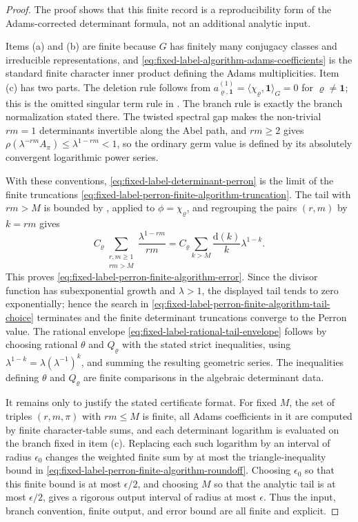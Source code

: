 \documentclass[11pt,a4paper]{amsart}
\theoremstyle{plain}
\theoremstyle{definition}
\theoremstyle{remark}
\begin{document}
\begin{proof}
  The proof shows that this finite record is a reproducibility form of the
  Adams-corrected determinant formula, not an additional analytic input.

  Items (a) and (b) are finite because \(G\) has finitely many conjugacy
  classes and irreducible representations, and
  \eqref{eq:fixed-label-algorithm-adams-coefficients} is the standard
  finite character inner product defining the Adams multiplicities.  Item
  (c) has two parts.  The deletion rule follows from
  \(a_{\varrho,\mathbf1}^{(1)}=\langle\chi_\varrho,\mathbf1\rangle_G=0\)
  for \(\varrho\neq\mathbf1\); this is the omitted singular term rule in
  .  The branch rule is exactly the
  branch normalization stated there.  The twisted spectral gap makes the
  non-trivial \(rm=1\) determinants invertible along the Abel path, and
  \(rm\ge2\) gives \(\rho(\lambda^{-rm}A_\pi)\le\lambda^{1-rm}<1\), so the
  ordinary germ value is defined by its absolutely convergent logarithmic
  power series.

  With these conventions, \eqref{eq:fixed-label-determinant-perron} is the
  limit of the finite truncations
  \eqref{eq:fixed-label-perron-finite-algorithm-truncation}.  The tail with
  \(rm>M\) is bounded by
  , applied to
  \(\phi=\chi_\varrho\), and regrouping the pairs \((r,m)\) by
  \(k=rm\) gives
  \[
    C_\varrho
    \sum_{\substack{r,m\ge1\\rm>M}}\frac{\lambda^{1-rm}}{rm}
    =
    C_\varrho\sum_{k>M}\frac{\mathrm d(k)}{k}\lambda^{1-k}.
  \]
  This proves \eqref{eq:fixed-label-perron-finite-algorithm-error}.  Since
  the divisor function has subexponential growth and \(\lambda>1\), the
  displayed tail tends to zero exponentially; hence the search in
  \eqref{eq:fixed-label-perron-finite-algorithm-tail-choice} terminates and
  the finite determinant truncations converge to the Perron value.  The
  rational envelope \eqref{eq:fixed-label-rational-tail-envelope} follows by
  choosing rational \(\theta\) and \(Q_\varrho\) with the stated strict
  inequalities, using \(\lambda^{1-k}=\lambda(\lambda^{-1})^k\), and summing
  the resulting geometric series.  The inequalities defining \(\theta\) and
  \(Q_\varrho\) are finite comparisons in the algebraic determinant data.

  It remains only to justify the stated certificate format.  For fixed
  \(M\), the set of triples \((r,m,\pi)\) with \(rm\le M\) is finite, all
  Adams coefficients in it are computed by finite character-table sums, and
  each determinant logarithm is evaluated on the branch fixed in item (c).
  Replacing each such logarithm by an interval of radius \(\epsilon_0\) changes
  the weighted finite sum by at most the triangle-inequality bound in
  \eqref{eq:fixed-label-perron-finite-algorithm-roundoff}.  Choosing
  \(\epsilon_0\) so that this finite bound is at most \(\epsilon/2\), and
  choosing \(M\) so that the analytic tail is at most \(\epsilon/2\), gives a
  rigorous output interval of radius at most \(\epsilon\).  Thus the input,
  branch convention, finite output, and error bound are all finite and
  explicit.
\end{proof}
\end{document}
